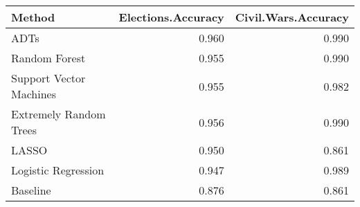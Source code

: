 \begin{table}[ht]
\centering
\begin{tabular}{lrr}
  \hline
Method & Elections.Accuracy & Civil.Wars.Accuracy \\ 
  \hline
ADTs & 0.960 & 0.990 \\ 
  Random Forest & 0.955 & 0.990 \\ 
  Support Vector Machines & 0.955 & 0.982 \\ 
  Extremely Random Trees & 0.956 & 0.990 \\ 
  LASSO & 0.950 & 0.861 \\ 
  Logistic Regression & 0.947 & 0.989 \\ 
  Baseline & 0.876 & 0.861 \\ 
   \hline
\end{tabular}
\end{table}
